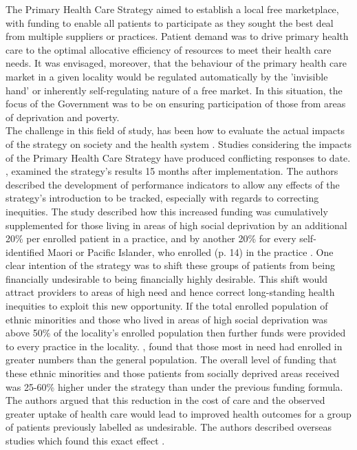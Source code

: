 \documentclass[11pt,a4paper]{article}
\begin{document}
The Primary Health Care Strategy aimed to establish a local free marketplace, with funding to enable all patients to participate as they sought the best deal from multiple suppliers or practices. Patient demand was to drive primary health care to the optimal allocative efficiency of resources to meet their health care needs. It was envisaged, moreover, that the behaviour of the primary health care market in a given locality would be regulated automatically by the 'invisible hand' or inherently self-regulating nature of a free market. In this situation, the focus of the Government was to be on ensuring participation of those from areas of deprivation and poverty. \\

The challenge in this field of study, has been how to evaluate the actual impacts of the strategy on society and the health system \citep{howell2005restructuring}. Studies considering the impacts of the Primary Health Care Strategy \citep{king2001primary} have produced conflicting responses to date. \citet{hefford2005reducing}, examined the strategy's results 15 months after implementation. The authors described the development of performance indicators to allow any effects of the strategy's introduction to be tracked, especially with regards to correcting inequities. The study described  how this increased funding was cumulatively supplemented for those living in areas of high social deprivation by an additional 20\% per enrolled patient in a practice, and by another 20\% for every self-identified Maori or Pacific Islander, who enrolled (p. 14) in the practice \citep{hefford2005reducing}. One clear intention of the strategy was to shift these groups of patients from being financially undesirable to being financially highly desirable. This shift would attract providers to areas of high need and hence correct long-standing health inequities to exploit this new opportunity. If the total enrolled population of ethnic minorities and those who lived in areas of high social deprivation was above 50\% of the locality's enrolled population then further funds were provided to every practice in the locality. \citet{hefford2005reducing}, found that those most in need had enrolled in greater numbers than the general population. The overall level of funding that these ethnic minorities and those patients from socially deprived areas  received was 25-60\% higher under the strategy than under the previous funding formula. The authors argued that this reduction in the cost of care and the observed greater uptake of health care would lead to improved health outcomes for a group of patients previously labelled as undesirable. The authors described overseas studies which found this exact effect \citep{hefford2005reducing}.\\
\end{document}
